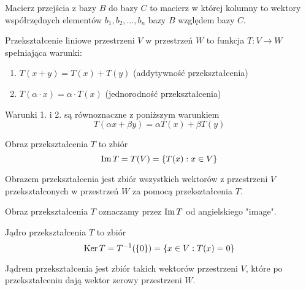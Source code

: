 \documentclass[a4paper,12pt]{article}
\begin{document}
\begin{intuitive}
	Macierz przejścia z bazy $B$ do bazy $C$ to macierz w której kolumny to wektory współrzędnych elementów $b_1,b_2,\dots,b_n$ bazy $B$ względem bazy $C$.
\end{intuitive}

\begin{definition}
	Przekształcenie liniowe przestrzeni $V$ w przestrzeń $W$ to funkcja $T\colon V \to W$ spełniająca warunki:
	\begin{enumerate}
		\item $T(x+y) = T(x) + T(y)$ \hfill (addytywność przekształcenia)
		\item $T(\alpha \cdot x) = \alpha \cdot T(x)$ \hfill (jednorodność przekształcenia)
	\end{enumerate}
\end{definition}

\begin{remark}
	Warunki 1. i 2. są równoznaczne z poniższym warunkiem
	\[
		T(\alpha x + \beta y) = \alpha T(x) + \beta T(y)
	\]
\end{remark}

\newpage

\begin{definition}
	Obraz przekształcenia $T$ to zbiór 
	\[
		\operatorname{Im} T = T(V) = \{ T(x) : x \in V \}
	\]
\end{definition}

\begin{intuitive}
	Obrazem przekształcenia jest zbiór wszystkich wektorów z przestrzeni $V$ przekształconych w przestrzeń $W$ za pomocą przekształcenia $T$.
\end{intuitive}

\begin{notation}
	Obraz przekształcenia $T$ oznaczamy przez $\operatorname{Im} T$ od angielskiego "image".
\end{notation}

\begin{definition}
	Jądro przekształcenia $T$ to zbiór
	\[
		\operatorname{Ker} T = T^{-1}(\{0\}) = \{ x \in V : T(x) = 0 \}  
	\]
\end{definition}

\begin{intuitive}
	Jądrem przekształcenia jest zbiór takich wektorów przestrzeni $V$, które po przekształceniu dają wektor zerowy przestrzeni $W$.
\end{intuitive}
\end{document}
